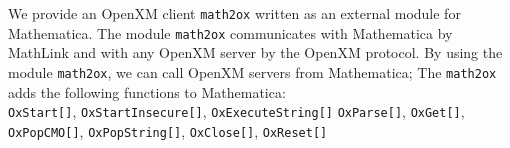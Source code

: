 We provide an OpenXM client {\tt math2ox} written as an external module
for Mathematica.  
The module {\tt math2ox} communicates with Mathematica by MathLink and
with any OpenXM server by the OpenXM protocol.  
By using the module {\tt math2ox},
we can call OpenXM servers from Mathematica;
The {\tt math2ox} adds the following functions to Mathematica:\\
{\tt OxStart[]},
{\tt OxStartInsecure[]},
{\tt OxExecuteString[]}
{\tt OxParse[]},
{\tt OxGet[]},
{\tt OxPopCMO[]},
{\tt OxPopString[]},
{\tt OxClose[]},
{\tt OxReset[]}


